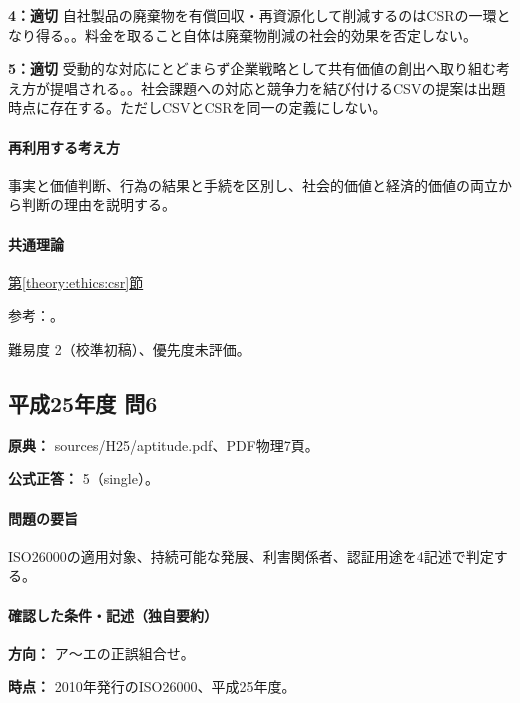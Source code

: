\noindent\textbf{4：適切} 自社製品の廃棄物を有償回収・再資源化して削減するのはCSRの一環となり得る。。料金を取ること自体は廃棄物削減の社会的効果を否定しない。\par

\noindent\textbf{5：適切} 受動的な対応にとどまらず企業戦略として共有価値の創出へ取り組む考え方が提唱される。。社会課題への対応と競争力を結び付けるCSVの提案は出題時点に存在する。ただしCSVとCSRを同一の定義にしない。\par

\paragraph{再利用する考え方} 事実と価値判断、行為の結果と手続を区別し、社会的価値と経済的価値の両立から判断の理由を説明する。

\paragraph{共通理論} \hyperref[theory:ethics:csr]{第\ref*{theory:ethics:csr}節}

\par 参考：\cite{iso26000,hbs_csv}。

\par 難易度 2（校準初稿）、優先度未評価。

\subsection{平成25年度 問6}
\label{q:h25-reg-apt-06}

\noindent\textbf{原典：} sources/H25/aptitude.pdf、PDF物理7頁。

\textbf{公式正答：} 5（single）。

\paragraph{問題の要旨} ISO26000の適用対象、持続可能な発展、利害関係者、認証用途を4記述で判定する。

\paragraph{確認した条件・記述（独自要約）}\mbox{}\par

\noindent\textbf{方向：} ア〜エの正誤組合せ。\par

\noindent\textbf{時点：} 2010年発行のISO26000、平成25年度。\par

